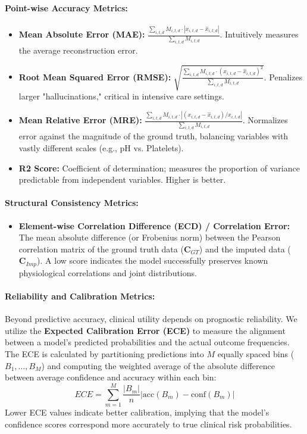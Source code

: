 \paragraph{Point-wise Accuracy Metrics:}
\begin{itemize}
    \item \textbf{Mean Absolute Error (MAE):} $\frac{\sum_{i,t,d} M_{i,t,d} \cdot |x_{i,t,d} - \hat{x}_{i,t,d}|}{\sum_{i,t,d} M_{i,t,d}}$. Intuitively measures the average reconstruction error.
    \item \textbf{Root Mean Squared Error (RMSE):} $\sqrt{\frac{\sum_{i,t,d} M_{i,t,d} \cdot (x_{i,t,d} - \hat{x}_{i,t,d})^2}{\sum_{i,t,d} M_{i,t,d}}}$. Penalizes larger "hallucinations," critical in intensive care settings.
    \item \textbf{Mean Relative Error (MRE):} $\frac{\sum_{i,t,d} M_{i,t,d} \cdot |(x_{i,t,d} - \hat{x}_{i,t,d}) / x_{i,t,d}|}{\sum_{i,t,d} M_{i,t,d}}$. Normalizes error against the magnitude of the ground truth, balancing variables with vastly different scales (e.g., pH vs. Platelets).
    \item \textbf{R2 Score:} Coefficient of determination; measures the proportion of variance predictable from independent variables. Higher is better.
\end{itemize}

\paragraph{Structural Consistency Metrics:}
\begin{itemize}
    \item \textbf{Element-wise Correlation Difference (ECD) / Correlation Error:} The mean absolute difference (or Frobenius norm) between the Pearson correlation matrix of the ground truth data ($\mathbf{C}_{GT}$) and the imputed data ($\mathbf{C}_{Imp}$). A low score indicates the model successfully preserves known physiological correlations and joint distributions.
\end{itemize}

\paragraph{Reliability and Calibration Metrics:}
Beyond predictive accuracy, clinical utility depends on prognostic reliability. We utilize the \textbf{Expected Calibration Error (ECE)} to measure the alignment between a model's predicted probabilities and the actual outcome frequencies. The ECE is calculated by partitioning predictions into $M$ equally spaced bins ($B_1, \dots, B_M$) and computing the weighted average of the absolute difference between average confidence and accuracy within each bin:
\begin{equation}
    ECE = \sum_{m=1}^M \frac{|B_m|}{n} \left| \text{acc}(B_m) - \text{conf}(B_m) \right|
\end{equation}
Lower ECE values indicate better calibration, implying that the model's confidence scores correspond more accurately to true clinical risk probabilities.
